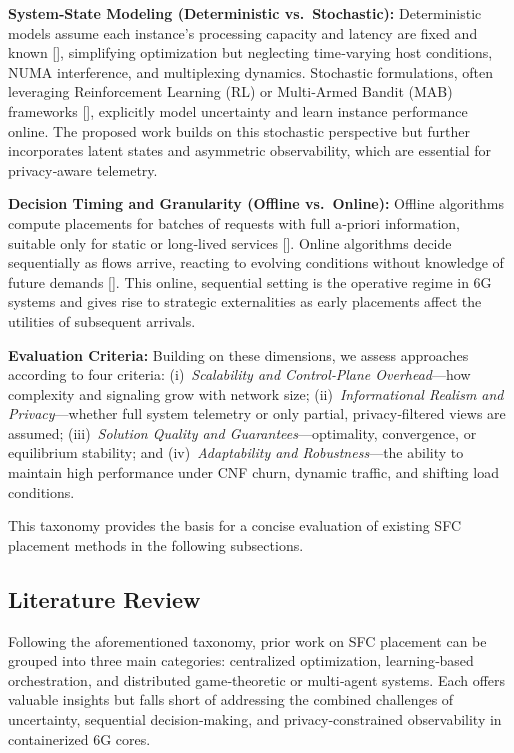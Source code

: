 \documentclass[journal]{IEEEtran}
\theoremstyle{plain}
\theoremstyle{definition}
\theoremstyle{remark}
\begin{document}
\textbf{System‑State Modeling (Deterministic vs.\ Stochastic):}
Deterministic models assume each instance’s processing capacity and latency are fixed and known [], simplifying optimization but neglecting time‑varying host conditions, NUMA interference, and multiplexing dynamics. Stochastic formulations, often leveraging Reinforcement Learning (RL) or Multi‑Armed Bandit (MAB) frameworks [], explicitly model uncertainty and learn instance performance online. The proposed work builds on this stochastic perspective but further incorporates latent states and asymmetric observability, which are essential for privacy‑aware telemetry.

\textbf{Decision Timing and Granularity (Offline vs.\ Online):}
Offline algorithms compute placements for batches of requests with full a‑priori information, suitable only for static or long‑lived services []. Online algorithms decide sequentially as flows arrive, reacting to evolving conditions without knowledge of future demands []. This online, sequential setting is the operative regime in 6G systems and gives rise to strategic externalities as early placements affect the utilities of subsequent arrivals.

\textbf{Evaluation Criteria:}
Building on these dimensions, we assess approaches according to four criteria:
(i)~\emph{Scalability and Control‑Plane Overhead}—how complexity and signaling grow with network size;  
(ii)~\emph{Informational Realism and Privacy}—whether full system telemetry or only partial, privacy‑filtered views are assumed;  
(iii)~\emph{Solution Quality and Guarantees}—optimality, convergence, or equilibrium stability; and  
(iv)~\emph{Adaptability and Robustness}—the ability to maintain high performance under CNF churn, dynamic traffic, and shifting load conditions.

This taxonomy provides the basis for a concise evaluation of existing SFC placement methods in the following subsections.

\subsection{Literature Review}
\label{sec:related_litreview}

Following the aforementioned taxonomy, prior work on SFC placement can be grouped into three main categories: centralized optimization, learning‑based orchestration, and distributed game‑theoretic or multi‑agent systems. Each offers valuable insights but falls short of addressing the combined challenges of uncertainty, sequential decision‑making, and privacy‑constrained observability in containerized 6G cores.
\end{document}
